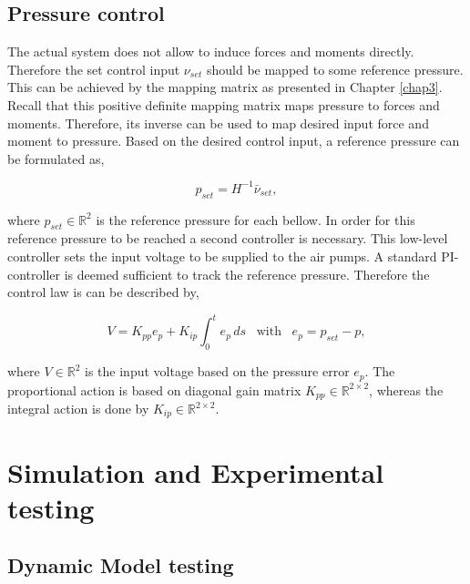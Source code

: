 \subsection{Pressure control}


The actual system does not allow to induce forces and moments directly. Therefore the set control input $\nu_{set}$ should be mapped to some reference pressure. This can be achieved by the mapping matrix as presented in Chapter \ref{chap3}. Recall that this positive definite mapping matrix maps pressure to forces and moments. Therefore, its inverse can be used to map desired input force and moment to pressure. Based on the desired control input, a reference pressure can be formulated as,

\begin{equation}
    p_{set} = H^{-1}\bar{\nu}_{set},
\end{equation}


where $p_{set} \in \mathbb{R}^2$ is the reference pressure for each bellow. In order for this reference pressure to be reached a second controller is necessary. This low-level controller sets the input voltage to be supplied to the air pumps. A standard PI-controller is deemed sufficient to track the reference pressure. Therefore the control law is can be described by,

\begin{equation}
    V = K_{pp}e_p + K_{ip} \int_0^t e_p \hspace{2pt} ds \hspace{10pt} \text{with} \hspace{10pt} e_p = p_{set} - p,
\end{equation}

where $V \in \mathbb{R}^2$ is the input voltage based on the pressure error $e_p$. The proportional action is based on diagonal gain matrix $K_{pp} \in \mathbb{R}^{2\times 2}$, whereas the integral action is done by $K_{ip} \in \mathbb{R}^{2\times 2}$.







\label{chap4b}

\section{Simulation and Experimental testing}


\subsection{Dynamic Model testing}



